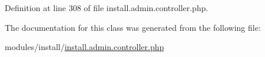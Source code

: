 Definition at line 308 of file install.\+admin.\+controller.\+php.



The documentation for this class was generated from the following file\+:\begin{DoxyCompactItemize}
\item 
modules/install/\hyperlink{install_8admin_8controller_8php}{install.\+admin.\+controller.\+php}\end{DoxyCompactItemize}
